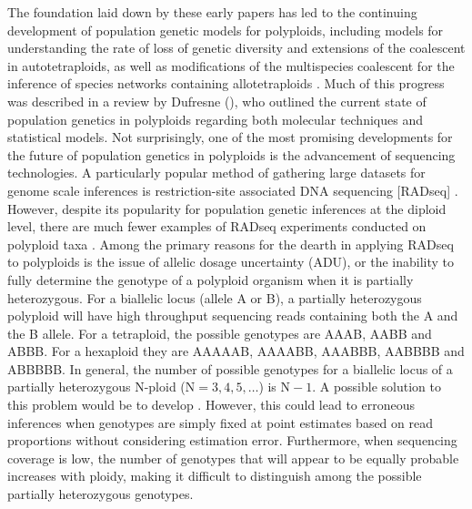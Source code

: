 \documentclass[11pt,english,letterpaper,oneside]{article}
\begin{document}
The foundation laid down by these early papers has led to the continuing development of population genetic models for polyploids, including models for understanding the rate of loss of genetic diversity and extensions of the coalescent in autotetraploids, as well as modifications of the multispecies coalescent for the inference of species networks containing allotetraploids \citep{moody1993autopolyploids,arnold2012autotetraploidCoal,jones2013allopolyploid}. Much of this progress was described in a review by Dufresne \etal{} (\citeyear{dufresne2014polyPopGen}), who outlined the current state of population genetics in polyploids regarding both molecular techniques and statistical models. Not surprisingly, one of the most promising developments for the future of population genetics in polyploids is the advancement of sequencing technologies. A particularly popular method of gathering large datasets for genome scale inferences is restriction-site associated DNA sequencing [RADseq] \citep{miller2007gbs,baird2008radTags,puritz2014demystifyingRAD}. However, despite its popularity for population genetic inferences at the diploid level, there are much fewer examples of RADseq experiments conducted on polyploid taxa \citep[but see][]{ogden2013sturgeonRADseq,wang2013birchRADseq,logan-young2015polyploidSNP}. Among the primary reasons for the dearth in applying RADseq to polyploids is the issue of allelic dosage uncertainty (ADU), or the inability to fully determine the genotype of a polyploid organism when it is partially heterozygous. For a biallelic locus (allele A or B), a partially heterozygous polyploid will have high throughput sequencing reads containing both the A and the B allele. For a tetraploid, the possible genotypes are AAAB, AABB and ABBB. For a hexaploid they are AAAAAB, AAAABB, AAABBB, AABBBB and ABBBBB. In general, the number of possible genotypes for a biallelic locus of a partially heterozygous N-ploid ($\text{N}=3,4,5,\ldots$) is $\text{N}-1$. A possible solution to this problem would be to develop . However, this could lead to erroneous inferences when genotypes are simply fixed at point estimates based on read proportions without considering estimation error. Furthermore, when sequencing coverage is low, the number of genotypes that will appear to be equally probable increases with ploidy, making it difficult to distinguish among the possible partially heterozygous genotypes.
\medskip
\end{document}
